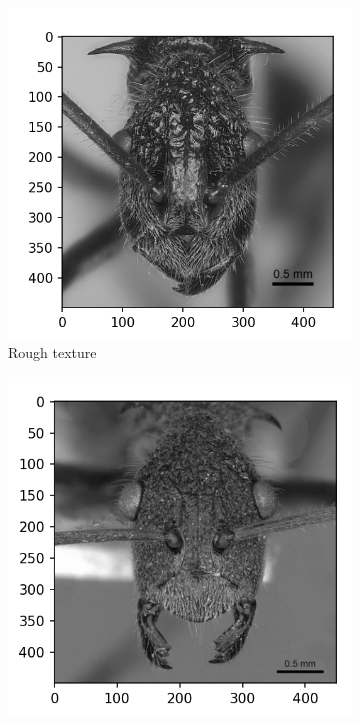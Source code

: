 \documentclass{aci}
\numberwithin{equation}{section}
\begin{document}
\newcommand{\segmentedsubwidth}{0.24\textwidth}
\begin{figure}
    \centering
    \begin{subfigure}{\segmentedsubwidth}
        \includegraphics[width=1\linewidth]{figs/r103.png}
        \caption*{Rough texture}
    \end{subfigure}
    \begin{subfigure}{\segmentedsubwidth}
        \includegraphics[width=1\linewidth]{figs/r111.png}

\end{subfigure}
\end{figure}
\end{document}
